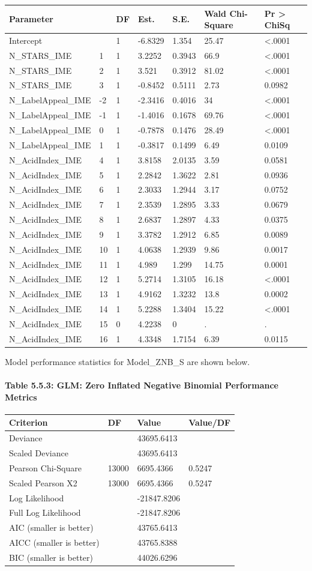 \documentclass[]{article}
\let\oldparagraph\paragraph
\renewcommand{\paragraph}[1]{\oldparagraph{#1}\mbox{}}
\begin{document}
\begin{longtable}[]{@{}lllllll@{}}
\toprule
Parameter & & DF & Est. & S.E. & Wald Chi-Square & Pr \textgreater{}
ChiSq\tabularnewline
\midrule
\endhead
Intercept & & 1 & -6.8329 & 1.354 & 25.47 &
\textless{}.0001\tabularnewline
N\_STARS\_IME & 1 & 1 & 3.2252 & 0.3943 & 66.9 &
\textless{}.0001\tabularnewline
N\_STARS\_IME & 2 & 1 & 3.521 & 0.3912 & 81.02 &
\textless{}.0001\tabularnewline
N\_STARS\_IME & 3 & 1 & -0.8452 & 0.5111 & 2.73 & 0.0982\tabularnewline
N\_LabelAppeal\_IME & -2 & 1 & -2.3416 & 0.4016 & 34 &
\textless{}.0001\tabularnewline
N\_LabelAppeal\_IME & -1 & 1 & -1.4016 & 0.1678 & 69.76 &
\textless{}.0001\tabularnewline
N\_LabelAppeal\_IME & 0 & 1 & -0.7878 & 0.1476 & 28.49 &
\textless{}.0001\tabularnewline
N\_LabelAppeal\_IME & 1 & 1 & -0.3817 & 0.1499 & 6.49 &
0.0109\tabularnewline
N\_AcidIndex\_IME & 4 & 1 & 3.8158 & 2.0135 & 3.59 &
0.0581\tabularnewline
N\_AcidIndex\_IME & 5 & 1 & 2.2842 & 1.3622 & 2.81 &
0.0936\tabularnewline
N\_AcidIndex\_IME & 6 & 1 & 2.3033 & 1.2944 & 3.17 &
0.0752\tabularnewline
N\_AcidIndex\_IME & 7 & 1 & 2.3539 & 1.2895 & 3.33 &
0.0679\tabularnewline
N\_AcidIndex\_IME & 8 & 1 & 2.6837 & 1.2897 & 4.33 &
0.0375\tabularnewline
N\_AcidIndex\_IME & 9 & 1 & 3.3782 & 1.2912 & 6.85 &
0.0089\tabularnewline
N\_AcidIndex\_IME & 10 & 1 & 4.0638 & 1.2939 & 9.86 &
0.0017\tabularnewline
N\_AcidIndex\_IME & 11 & 1 & 4.989 & 1.299 & 14.75 &
0.0001\tabularnewline
N\_AcidIndex\_IME & 12 & 1 & 5.2714 & 1.3105 & 16.18 &
\textless{}.0001\tabularnewline
N\_AcidIndex\_IME & 13 & 1 & 4.9162 & 1.3232 & 13.8 &
0.0002\tabularnewline
N\_AcidIndex\_IME & 14 & 1 & 5.2288 & 1.3404 & 15.22 &
\textless{}.0001\tabularnewline
N\_AcidIndex\_IME & 15 & 0 & 4.2238 & 0 & . & .\tabularnewline
N\_AcidIndex\_IME & 16 & 1 & 4.3348 & 1.7154 & 6.39 &
0.0115\tabularnewline
\bottomrule
\end{longtable}

Model performance statistics for Model\_ZNB\_S are shown below.

\paragraph{Table 5.5.3: GLM: Zero Inflated Negative Binomial Performance
Metrics}\label{table-5.5.3-glm-zero-inflated-negative-binomial-performance-metrics}

\begin{longtable}[]{@{}llll@{}}
\toprule
Criterion & DF & Value & Value/DF\tabularnewline
\midrule
\endhead
Deviance & & 43695.6413 &\tabularnewline
Scaled Deviance & & 43695.6413 &\tabularnewline
Pearson Chi-Square & 13000 & 6695.4366 & 0.5247\tabularnewline
Scaled Pearson X2 & 13000 & 6695.4366 & 0.5247\tabularnewline
Log Likelihood & & -21847.8206 &\tabularnewline
Full Log Likelihood & & -21847.8206 &\tabularnewline
AIC (smaller is better) & & 43765.6413 &\tabularnewline
AICC (smaller is better) & & 43765.8388 &\tabularnewline
BIC (smaller is better) & & 44026.6296 &\tabularnewline
\bottomrule
\end{longtable}
\end{document}
